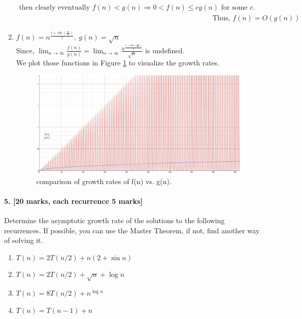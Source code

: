 \documentclass[a4paper]{scrartcl}
\begin{document}
\begin{enumerate}[label=(\alph*)]
\begin{align*}
    \text{then clearly eventually }f(n)<g(n) \Rightarrow 0<f(n)\leq cg(n)\text{ for some }c.\\ &\
  \text{Thus, }f(n)=O(g(n))
  \end{align*}
  \item $f(n)=n^{\frac{1+\sin(\frac{\pi n}{2})}{2}},\ g(n)=\sqrt{n}$\\
  Since, $\lim_{n\to\infty} \frac{f(n)}{g(n)}=\lim_{n\to\infty} \frac{n^{\frac{1+\sin(\frac{\pi n}{2})}{2}}}{\sqrt{n}}$  is undefined.\\
  We plot those functions in Figure \ref{fig:f(n)-vs-g(n)} to visualize the growth rates.
  \begin{figure}[h!]
    \includegraphics[width=\linewidth]{f(n)-vs-g(n).png}
    \caption{comparison of growth rates of f(n) vs. g(n).}
    \label{fig:f(n)-vs-g(n)}
  \end{figure}
  
 \end{enumerate}
\paragraph{5. [20 marks, each recurrence 5 marks]}
\label{sec:Question 5}
Determine the asymptotic growth rate of the solutions to the following recurrences. If possible, you can use the Master Theorem, if not, find another way of solving it.
\begin{enumerate}[label=(\alph*)]
  \item $T (n) = 2T (n/2) + n(2 + \sin{n})$
  \item $T (n) = 2T (n/2) + \sqrt{n} + \log{n}$
  \item $T (n) = 8T (n/2) + n^{\log{n}}$
  \item $T (n) = T (n − 1) + n$
\end{enumerate}
\end{document}
